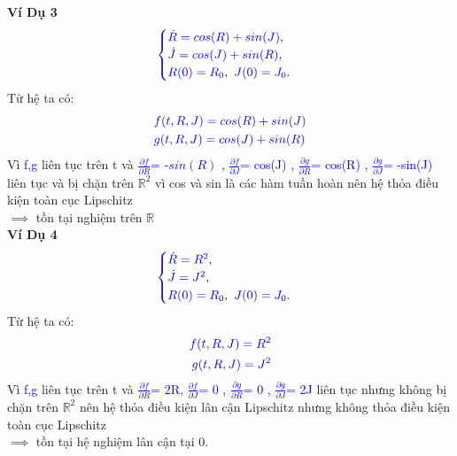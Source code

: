 \documentclass[a4paper]{article}
\begin{document}
  \textbf{Ví Dụ 3} 
 \begin{align}
	    \textcolor{blue}{
	    \begin{cases}
            \dot R = cos(R)+sin(J)\textcolor{black}{,}\\
            \dot J =  cos(J)+sin(R)\textcolor{black}{,}\\
            R(0) = R_0\textcolor{black}{,} \enskip J(0) = J_0 \textcolor{black}{.}
        \end{cases}
        }
        \label{label9}
	\end{align}
 Từ hệ ta có:
 \begin{align}
    &\textcolor{blue}{ f(t,R,J)= cos(R)+sin(J)}\\ &\textcolor{blue}{ g(t,R,J)=cos(J)+sin(R)}
 \end{align}
  Vì \textcolor{blue}{f,g} liên tục trên t và \textcolor{blue}{$\frac{\partial f}{\partial R}$= -$sin(R)$ ,  $\frac{\partial f}{\partial J}$= cos(J) , $\frac{\partial g}{\partial R}$= cos(R)  , $\frac{\partial g}{\partial J}$= -sin(J)}  liên tục và bị chặn trên $\mathbb{R}^{2}$ vì cos và sin là các hàm tuần hoàn nên hệ thỏa điều kiện toàn cục Lipschitz \\$\implies$ tồn tại nghiệm trên $\mathbb{R}$\\
  \textbf{Ví Dụ 4} 
 \begin{align}
	    \textcolor{blue}{
	    \begin{cases}
            \dot R = R^{2}\textcolor{black}{,}\\
            \dot J = J^{2}\textcolor{black}{,}\\
            R(0) = R_0\textcolor{black}{,} \enskip J(0) = J_0 \textcolor{black}{.}
        \end{cases}
        }
        \label{label9}
	\end{align}
 Từ hệ ta có:
 \begin{align}
    \textcolor{blue}{ f(t,R,J)= R^{2}}\\ \textcolor{blue}{ g(t,R,J)=J^{2}}
 \end{align}
  Vì \textcolor{blue}{f,g} liên tục trên t và \textcolor{blue}{$\frac{\partial f}{\partial R}$= 2R,  $\frac{\partial f}{\partial J}$= 0 , $\frac{\partial g}{\partial R}$= 0  , $\frac{\partial g}{\partial J}$= 2J}  liên tục nhưng không bị chặn trên $\mathbb{R}^{2}$  nên hệ thỏa điều kiện lân cận Lipschitz nhưng không thỏa điều kiện toàn cục Lipschitz \\$\implies$ tồn tại hệ nghiệm lân cận tại 0.\\
\end{document}
